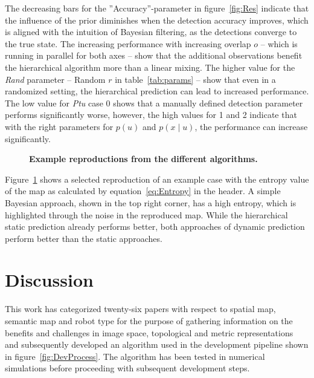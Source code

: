 \documentclass[twocolumn,letterpaper]{IEEEAerospaceCLS}  %
\begin{document}
The decreasing bars for the ''Accuracy''-parameter in figure~\ref{fig:Res} indicate that the influence of the prior diminishes when the detection accuracy improves, which is aligned with the intuition of Bayesian filtering, as the detections converge to the true state. The increasing performance with increasing overlap $o$ -- which is running in parallel for both axes -- show that the additional observations benefit the hierarchical algorithm more than a linear mixing. The higher value for the \emph{Rand} parameter -- Random $r$ in table~\ref{tab:params} -- show that even in a randomized setting, the hierarchical prediction can lead to increased performance. The low value for \emph{Ptu} case 0 shows that a manually defined detection parameter performs significantly worse, however, the high values for 1 and 2 indicate that with the right parameters for $p(u)$ and $p(x\mid u)$, the performance can increase significantly.
\begin{figure}
    \centering
    \caption{\bf{
        Example reproductions from the different algorithms. 
    }}
    \label{fig:SampRes}
\end{figure}

Figure~\ref{fig:SampRes} shows a selected reproduction of an example case with the entropy value of the map as calculated by equation~\ref{eq:Entropy} in the header. A simple Bayesian approach, shown in the top right corner, has a high entropy, which is highlighted through the noise in the reproduced map. While the hierarchical static prediction already performs better, both approaches of dynamic prediction perform better than the static approaches.
\section{Discussion} \label{sec:Disc}
This work has categorized twenty-six papers with respect to spatial map, semantic map and robot type for the purpose of gathering information on the benefits and challenges in image space, topological and metric representations and subsequently developed an algorithm used in the development pipeline shown in figure~\ref{fig:DevProcess}. The algorithm has been tested in numerical simulations before proceeding with subsequent development steps.
\end{document}
